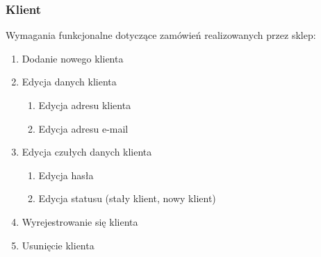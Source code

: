 \subsubsection{Klient}

Wymagania funkcjonalne dotyczące zamówień realizowanych przez sklep:

\begin{enumerate}
  \item Dodanie nowego klienta
  \item Edycja danych klienta
  \begin{enumerate}
    \item Edycja adresu klienta
    \item Edycja adresu e-mail
  \end{enumerate}
  \item Edycja czułych danych klienta
  \begin{enumerate}
    \item Edycja hasła
    \item Edycja statusu (stały klient, nowy klient)
  \end{enumerate}
  \item Wyrejestrowanie się klienta
  \item Usunięcie klienta
\end{enumerate}

